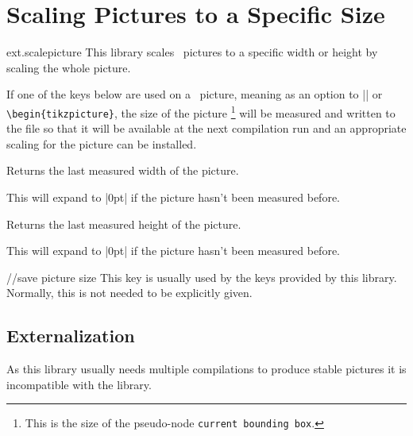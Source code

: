 %
%
%
\clearpage
\section{Scaling Pictures to a Specific Size}
\label{library:scalepicture}

\begin{tikzlibrary}{ext.scalepicture}
  This library scales \tikzname\ pictures to a specific width or height
  by scaling the whole picture.
\end{tikzlibrary}

\begin{multicols}{2}
If one of the keys below are used on a \tikzname\ picture, meaning
as an option to |\tikzpicture| or \texttt{\textbackslash begin\{tikzpicture\}},
the size of the picture%
\footnote{This is the size of the pseudo-node \texttt{current bounding box}.}
will be measured and written to the  file
so that it will be available at the next compilation run
and an appropriate scaling for the picture can be installed.

\begin{command}{\tikzextpicturewidth}
  Returns the last measured width of the picture.
  
  This will expand to |0pt| if the picture hasn't been measured before.
\end{command}
\begin{command}{\tikzextpictureheight}
  Returns the last measured height of the picture.
  
  This will expand to |0pt| if the picture hasn't been measured before.
\end{command}

\begin{stylekey}{/\tikzext/save picture size}
  This key is usually used by the keys provided by this library.
  Normally, this is not needed to be explicitly given.
\end{stylekey}

\subsection{Externalization}
As this library usually needs multiple compilations
to produce stable pictures it is incompatible
with the  library.


\end{multicols}
